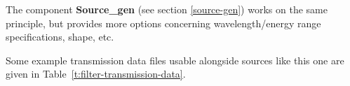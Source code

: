 The component \textbf{Source\_gen} (see section \ref{source-gen})
works on the same principle, but provides more options concerning
wavelength/energy range specifications, shape, etc.

Some example transmission data files usable alongside sources like this one
are given in Table~\ref{t:filter-transmission-data}.

